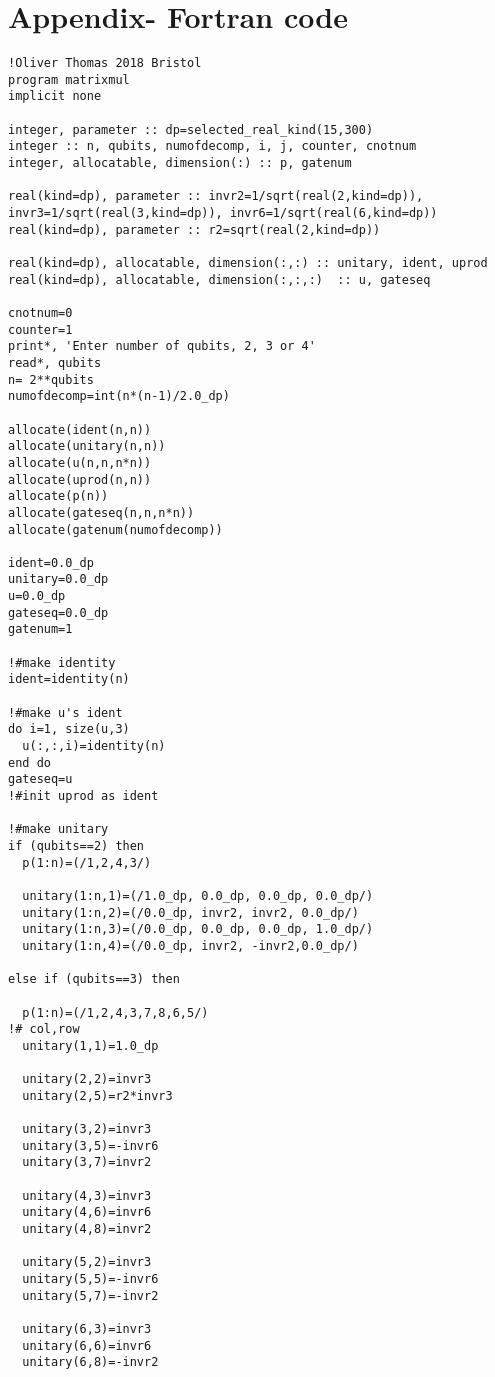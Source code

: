 \appendix
\section{Appendix- Fortran code}
\begin{verbatim}
!Oliver Thomas 2018 Bristol
program matrixmul
implicit none

integer, parameter :: dp=selected_real_kind(15,300)
integer :: n, qubits, numofdecomp, i, j, counter, cnotnum
integer, allocatable, dimension(:) :: p, gatenum

real(kind=dp), parameter :: invr2=1/sqrt(real(2,kind=dp)), invr3=1/sqrt(real(3,kind=dp)), invr6=1/sqrt(real(6,kind=dp))
real(kind=dp), parameter :: r2=sqrt(real(2,kind=dp)) 

real(kind=dp), allocatable, dimension(:,:) :: unitary, ident, uprod
real(kind=dp), allocatable, dimension(:,:,:)  :: u, gateseq

cnotnum=0
counter=1
print*, 'Enter number of qubits, 2, 3 or 4'
read*, qubits
n= 2**qubits
numofdecomp=int(n*(n-1)/2.0_dp)

allocate(ident(n,n))
allocate(unitary(n,n))
allocate(u(n,n,n*n))
allocate(uprod(n,n))
allocate(p(n))
allocate(gateseq(n,n,n*n))
allocate(gatenum(numofdecomp))

ident=0.0_dp
unitary=0.0_dp
u=0.0_dp
gateseq=0.0_dp
gatenum=1

!#make identity
ident=identity(n)

!#make u's ident 
do i=1, size(u,3)
  u(:,:,i)=identity(n)
end do
gateseq=u
!#init uprod as ident

!#make unitary
if (qubits==2) then 
  p(1:n)=(/1,2,4,3/)

  unitary(1:n,1)=(/1.0_dp, 0.0_dp, 0.0_dp, 0.0_dp/)
  unitary(1:n,2)=(/0.0_dp, invr2, invr2, 0.0_dp/)
  unitary(1:n,3)=(/0.0_dp, 0.0_dp, 0.0_dp, 1.0_dp/)
  unitary(1:n,4)=(/0.0_dp, invr2, -invr2,0.0_dp/)

else if (qubits==3) then

  p(1:n)=(/1,2,4,3,7,8,6,5/)
!# col,row
  unitary(1,1)=1.0_dp

  unitary(2,2)=invr3
  unitary(2,5)=r2*invr3

  unitary(3,2)=invr3
  unitary(3,5)=-invr6
  unitary(3,7)=invr2

  unitary(4,3)=invr3
  unitary(4,6)=invr6
  unitary(4,8)=invr2

  unitary(5,2)=invr3
  unitary(5,5)=-invr6
  unitary(5,7)=-invr2

  unitary(6,3)=invr3
  unitary(6,6)=invr6
  unitary(6,8)=-invr2


\end{verbatim}
